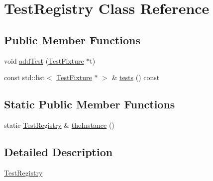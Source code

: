 \hypertarget{class_test_registry}{\section{Test\-Registry Class Reference}
\label{class_test_registry}
}
\subsection*{Public Member Functions}
\begin{DoxyCompactItemize}
\item 
void \hyperlink{class_test_registry_ad19748fbf6fc3f57a0908480c7ba037c}{add\-Test} (\hyperlink{class_test_fixture}{Test\-Fixture} $\ast$t)
\item 
const std\-::list$<$ \hyperlink{class_test_fixture}{Test\-Fixture} $\ast$ $>$ \& \hyperlink{class_test_registry_a6b210f5dd4f082f7ecbfc1ce8d9775ed}{tests} () const 
\end{DoxyCompactItemize}
\subsection*{Static Public Member Functions}
\begin{DoxyCompactItemize}
\item 
static \hyperlink{class_test_registry}{Test\-Registry} \& \hyperlink{class_test_registry_a73e716bfead25f7f95fb1ec7783c83ad}{the\-Instance} ()
\end{DoxyCompactItemize}


\subsection{Detailed Description}
\hyperlink{class_test_registry}{Test\-Registry} 

